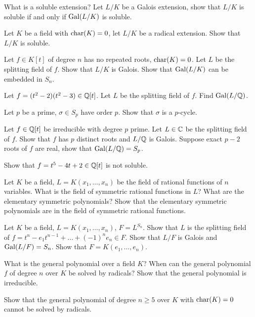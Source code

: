 \begin{question}{35}
    What is a soluble extension? Let $L/K$ be a Galois extension, show that $L/K$ is soluble if and only if $\text{Gal}(L/K)$ is soluble.

    Let $K$ be a field with $\text{char}(K) = 0$, let $L/K$ be a radical extension. Show that $L/K$ is soluble.
\end{question}

\begin{question}{36}
    Let $f \in K[t]$ of degree $n$ has no repeated roots, $\text{char}(K) = 0$. Let $L$ be the splitting field of $f$. Show that $L/K$ is Galois. Show that $\text{Gal}(L/K)$ can be embedded in $S_n$.

    Let $f = (t^2-2)(t^2 - 3) \in \mathbb{Q}[t]$. Let $L$ be the splitting field of $f$. Find $\text{Gal}(L/\mathbb{Q})$.
\end{question}

\begin{question}{37}
    Let $p$ be a prime, $\sigma \in S_p$ have order $p$. Show that $\sigma$ is a $p$-cycle.

    Let $f \in \mathbb{Q}[t]$ be irreducible with degree $p$ prime. Let $L \in \mathbb{C}$ be the splitting field of $f$. Show that $f$ has $p$ distinct roots and $L/\mathbb{Q}$ is Galois. Suppose exact $p-2$ roots of $f$ are real, show that $\text{Gal}(L/\mathbb{Q}) = S_p$.

    Show that $f = t^5 -4t + 2 \in \mathbb{Q}[t]$ is not soluble.
\end{question}

\begin{question}{38}
    Let $K$ be a field, $L = K(x_1,\dots,x_n)$ be the field of rational functions of $n$ variables. What is the field of symmetric rational functions in $L$? What are the elementary symmetric polynomials? Show that the elementary symmetric polynomials are in the field of symmetric rational functions.

    Let $K$ be a field, $L = K(x_1,\dots,x_n)$, $F = L^{S_n}$. Show that $L$ is the splitting field of $f = t^n - e_1 t^{n-1} + \dots + (-1)^n e_n \in F$. Show that $L/F$ is Galois and $\text{Gal}(L/F) = S_n$. Show that $F = K(e_1,\dots,e_n)$.
\end{question}

\begin{question}{39}
    What is the general polynomial over a field $K$? When can the general polynomial $f$ of degree $n$ over $K$ be solved by radicals? Show that the general polynomial is irreducible.

    Show that the general polynomial of degree $n \geq 5$ over $K$ with $\text{char}(K) = 0$ cannot be solved by radicals.
    
\end{question}
    
